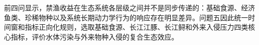 前四问显示，禁渔收益在生态系统各层级之间并不是同步传递的：基础食源、经济鱼类、珍稀物种以及系统长期动力学行为的响应存在明显差异。问题五因此统一时间窗和指标正向化规则，选取基础食源、长江江豚、长江鲟和外来入侵压力四类核心指标，评价水体污染与外来物种入侵的复合生态效应。